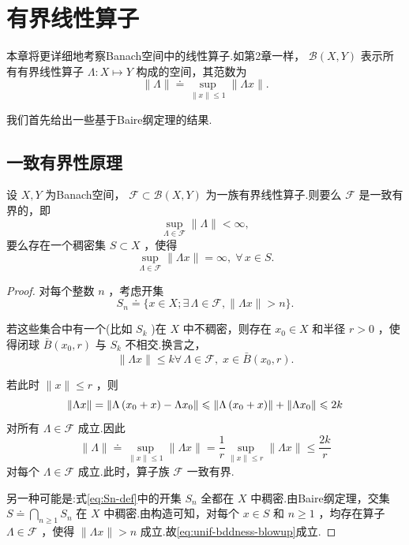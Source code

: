 \chapter{有界线性算子}
\vspace{-2em}

本章将更详细地考察Banach空间中的线性算子.如第2章一样， $\mathcal{B}\left( {X,Y}\right)$ 表示所有有界线性算子 $\Lambda  : X \mapsto  Y$ 构成的空间，其范数为
\[
\| \Lambda \|  \doteq  \mathop{\sup }\limits_{{\| x\|  \leq  1}}\| {\Lambda x}\| .
\]

我们首先给出一些基于Baire纲定理的结果.

\section{一致有界性原理}

\begin{theorem}\label{thm:banach-steinhaus}
设 $X,Y$ 为Banach空间， $\mathcal{F} \subset  \mathcal{B}\left( {X,Y}\right)$ 为一族有界线性算子.则要么 $\mathcal{F}$ 是一致有界的，即
\[
\mathop{\sup }\limits_{{\Lambda  \in  \mathcal{F}}}\| \Lambda \|  < \infty ,
\]
要么存在一个稠密集 $S \subset  X$ ，使得
\begin{equation}\tag{4.1}\label{eq:unif-bddness-blowup}
\mathop{\sup }\limits_{{\Lambda  \in  \mathcal{F}}}\| {\Lambda x}\|  = \infty ,\;\forall\,x \in  S.
\end{equation}
\end{theorem}

\begin{proof}
对每个整数 $n$ ，考虑开集
\begin{equation}\tag{4.2}\label{eq:Sn-def}
{S}_{n} \doteq  \{ x \in  X;\exists\,\Lambda\in\mathcal{F},\| {\Lambda x}\|  > n\} .
\end{equation}

若这些集合中有一个(比如 ${S}_{k}$ )在 $X$ 中不稠密，则存在 ${x}_{0} \in  X$ 和半径 $r > 0$ ，使得闭球 $\bar{B}\left( {{x}_{0},r}\right)$ 与 ${S}_{k}$ 不相交.换言之，
\[
\| {\Lambda x}\|  \leq  k\forall\,\Lambda  \in  \mathcal{F},\;x \in  \bar{B}\left( {{x}_{0},r}\right) .
\]

若此时 $\| x\|  \leq  r$ ，则
\[
\| {\Lambda x}\|  = \norm{\Lambda \left( {{x}_{0} + x}\right)  - \Lambda {x}_{0}} \leqslant  \norm{\Lambda \left( {{x}_{0} + x}\right) } + \norm{\Lambda {x}_{0}} \leqslant  {2k}
\]
对所有 $\Lambda  \in  \mathcal{F}$ 成立.因此
\[
\| \Lambda \|  \doteq  \mathop{\sup }\limits_{{\| x\|  \leq  1}}\| {\Lambda x}\|  = \frac{1}{r}\mathop{\sup }\limits_{{\| x\|  \leq  r}}\| {\Lambda x}\|  \leq  \frac{2k}{r}
\]
对每个 $\Lambda  \in  \mathcal{F}$ 成立.此时，算子族 $\mathcal{F}$ 一致有界.

另一种可能是:式\eqref{eq:Sn-def}中的开集 ${S}_{n}$ 全都在 $X$ 中稠密.由Baire纲定理，交集 $S \doteq  \mathop{\bigcap }\limits_{{n \geq  1}}{S}_{n}$ 在 $X$ 中稠密.由构造可知，对每个 $x \in  S$ 和 $n \geq  1$ ，均存在算子 $\Lambda  \in  \mathcal{F}$ ，使得 $\| {\Lambda x}\|  > n$ 成立.故\eqref{eq:unif-bddness-blowup}成立.
\end{proof}

